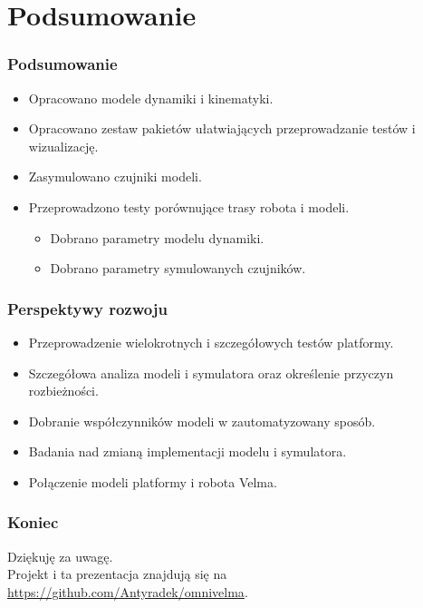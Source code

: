 \documentclass{beamer}
\begin{document}
	\section{Podsumowanie}
	\begin{frame}
		\frametitle{Podsumowanie}
		\begin{itemize}
			\item Opracowano modele dynamiki i kinematyki.
			\item Opracowano zestaw pakietów ułatwiających przeprowadzanie testów i wizualizację.
			\item Zasymulowano czujniki modeli.
			\item Przeprowadzono testy porównujące trasy robota i modeli.
			\begin{itemize}
				\item Dobrano parametry modelu dynamiki.
				\item Dobrano parametry symulowanych czujników.
			\end{itemize}
		\end{itemize}
	\end{frame}
	\begin{frame}
		\frametitle{Perspektywy rozwoju}
		\begin{itemize}
			\item Przeprowadzenie wielokrotnych i szczegółowych testów platformy.
			\item Szczegółowa analiza modeli i symulatora oraz określenie przyczyn rozbieżności.
			\item Dobranie współczynników modeli w zautomatyzowany sposób.
			\item Badania nad zmianą implementacji modelu i symulatora.
			\item Połączenie modeli platformy i robota Velma.
		\end{itemize}
	\end{frame}
	\begin{frame}
		\frametitle{Koniec}
		\centering
		Dziękuję za uwagę.\\
		Projekt i ta prezentacja znajdują się na \url{https://github.com/Antyradek/omnivelma}.
	\end{frame}
\end{document}

